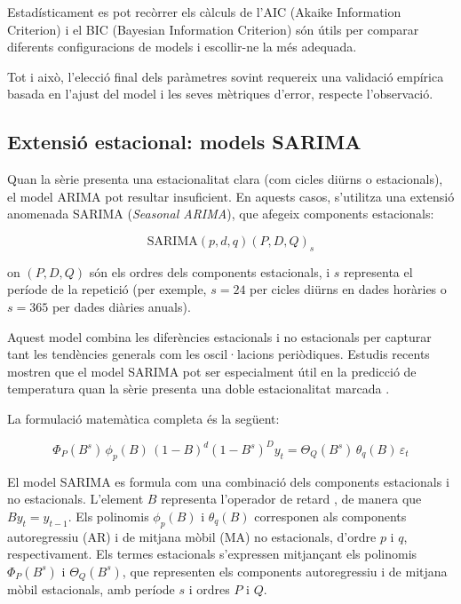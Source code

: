 \documentclass[../main.tex]{subfiles}
\begin{document}
Estadísticament es pot recòrrer els càlculs de l’AIC (Akaike Information Criterion) i el BIC (Bayesian Information Criterion) són útils per comparar diferents configuracions de models i escollir-ne la més adequada. \parencite{murat2018forecasting}

Tot i això, l’elecció final dels paràmetres sovint requereix una validació empírica basada en l’ajust del model i les seves mètriques d’error, respecte l'observació.


\subsection{Extensió estacional: models SARIMA}

Quan la sèrie presenta una estacionalitat clara (com cicles diürns o estacionals), el model ARIMA pot resultar insuficient. En aquests casos, s’utilitza una extensió anomenada SARIMA (\textit{Seasonal ARIMA}), que afegeix components estacionals:

\begin{equation}
\text{SARIMA}(p,d,q)(P,D,Q)_s
\label{eq:sarima_model}
\end{equation}

on $(P, D, Q)$ són els ordres dels components estacionals, i $s$ representa el període de la repetició (per exemple, $s=24$ per cicles diürns en dades horàries o $s=365$ per dades diàries anuals).

Aquest model combina les diferències estacionals i no estacionals per capturar tant les tendències generals com les oscil·lacions periòdiques. Estudis recents mostren que el model SARIMA pot ser especialment útil en la predicció de temperatura quan la sèrie presenta una doble estacionalitat marcada \parencite{murat2018forecasting, koccak2023time}.

La formulació matemàtica completa és la següent:

\begin{equation}
\Phi_P(B^s) \, \phi_p(B) \, (1 - B)^d (1 - B^s)^D y_t = \Theta_Q(B^s) \, \theta_q(B) \, \varepsilon_t
\label{eq:sarima_expandida}
\end{equation}

El model SARIMA es formula com una combinació dels components estacionals i no estacionals. L’element $B$ representa l’operador de retard , de manera que $B y_t = y_{t-1}$. Els polinomis $\phi_p(B)$ i $\theta_q(B)$ corresponen als components autoregressiu (AR) i de mitjana mòbil (MA) no estacionals, d’ordre $p$ i $q$, respectivament. Els termes estacionals s’expressen mitjançant els polinomis $\Phi_P(B^s)$ i $\Theta_Q(B^s)$, que representen els components autoregressiu i de mitjana mòbil estacionals, amb període $s$ i ordres $P$ i $Q$.
\end{document}
